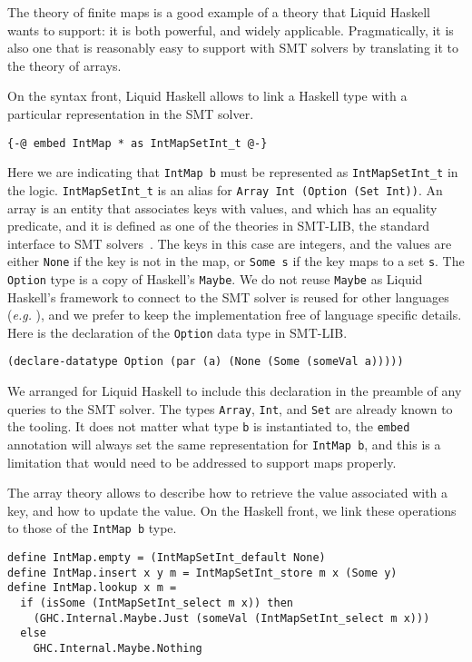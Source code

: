 \documentclass[sigconf, review]{acmart}
\newcommand{\tc}[1]{{\small\texttt{#1}}}
\begin{document}
The theory of finite maps is a good example of a theory that Liquid Haskell wants
to support: it is both powerful, and widely applicable. Pragmatically, it is also
one that is reasonably easy to support with SMT solvers by translating it to
the theory of arrays.

On the syntax front, Liquid Haskell allows to link a Haskell type with a particular
representation in the SMT solver.

\begin{verbatim}
{-@ embed IntMap * as IntMapSetInt_t @-}
\end{verbatim}

Here we are indicating that \tc{IntMap b} must be represented as \tc{IntMapSetInt\_t}
in the logic. \tc{IntMapSetInt\_t} is an alias for \tc{Array Int (Option (Set Int))}.
An array is an entity that associates keys with values, and which has an equality predicate,
and it is defined as one of the theories in SMT-LIB, the standard interface
to SMT solvers~\cite{BarFT-RR-25}.
The keys in this case are integers, and the values are either \tc{None} if the key
is not in the map, or \tc{Some s} if the key maps to a set \tc{s}. The
\tc{Option} type is a copy of Haskell's \tc{Maybe}.
We do not reuse \tc{Maybe} as Liquid Haskell's framework to connect to the SMT solver is
reused for other languages (\emph{e.g.} \cite{lehmann23}), and we prefer to keep
the implementation free of language specific details.
Here is the declaration of the \tc{Option} data type in SMT-LIB.

\begin{verbatim}
(declare-datatype Option (par (a) (None (Some (someVal a)))))
\end{verbatim}

We arranged for Liquid Haskell to include this declaration in the preamble of any
queries to the SMT solver. The types \tc{Array}, \tc{Int}, and \tc{Set} are already
known to the tooling.
It does not matter what type \tc{b} is instantiated to, the \tc{embed} annotation will
always set the same representation for \tc{IntMap b}, and this is a limitation that
would need to be addressed to support maps properly.

The array theory allows to describe how to retrieve the value associated with
a key, and how to update the value. On the Haskell front, we link these operations
to those of the \tc{IntMap b} type.

\begin{verbatim}
define IntMap.empty = (IntMapSetInt_default None)
define IntMap.insert x y m = IntMapSetInt_store m x (Some y)
define IntMap.lookup x m =
  if (isSome (IntMapSetInt_select m x)) then
    (GHC.Internal.Maybe.Just (someVal (IntMapSetInt_select m x)))
  else
    GHC.Internal.Maybe.Nothing
\end{verbatim}
\end{document}
